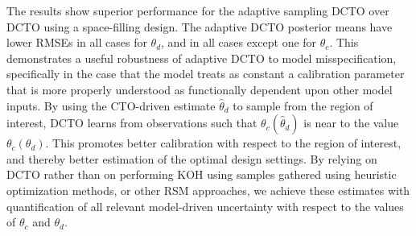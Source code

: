 \documentclass[12pt]{article}
\begin{document}
%
The results show superior performance for the adaptive sampling DCTO over DCTO using a space-filling design.
%
The adaptive DCTO posterior means have lower RMSEs in all cases for $\theta_d$, and in all cases except one for $\theta_c$.
%
This demonstrates a useful robustness of adaptive DCTO to model misspecification, specifically in the case that the model treats as constant a calibration parameter that is more properly understood as functionally dependent upon other model inputs.
%
By using the CTO-driven estimate $\widehat\theta_d$ to sample from the region of interest, DCTO learns from observations such that $\theta_c(\widehat\theta_d)$ is near to the value $\theta_c(\theta_d)$.
%
This promotes better calibration with respect to the region of interest, and thereby better estimation of the optimal design settings.
%
By relying on DCTO rather than on performing KOH using samples gathered using heuristic optimization methods, or other RSM approaches, we achieve these estimates with quantification of all relevant model-driven uncertainty with respect to the values of $\theta_c$ and $\theta_d$.
%

%
\end{document}
